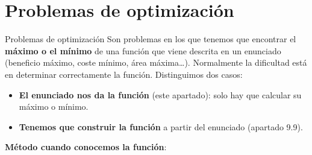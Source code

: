 \documentclass[11pt,a4paper]{article}
\makeatletter
\newcommand{\fmm}[1]{\setbox0=\hbox{$#1$}\ifdim\wd0>0.8\linewidth\def\fmmnext{\fmmdisp{#1}}\else\def\fmmnext{\mbox{\box0}}\fi\fmmnext}
\def\fmmdisp#1{\@ifnextchar.{\fmmdispp{#1}}{\@ifnextchar,{\fmmdispc{#1}}{\@ifnextchar;{\fmmdisps{#1}}{\fmdisp{#1}}}}}
\def\fmmdispp#1.{\fmdisp{#1\,.}}\def\fmmdispc#1,{\fmdisp{#1\,,}}\def\fmmdisps#1;{\fmdisp{#1\,;}}
\newcommand{\fmdisp}[1]{\[\setbox2=\hbox{$\displaystyle #1$}\ifdim\wd2>\linewidth\resizebox{\linewidth}{!}{\box2}\else\box2\fi\]}
\newcommand{\fmuline}[1]{\textbf{\color{fmaccent}#1}}
\makeatother
\begin{document}
\Needspace{5.7cm}
\section{Problemas de optimización}\hypertarget{sec9}{}
\begin{fmdef}{Problemas de optimización}
Son problemas en los que tenemos que encontrar el \textbf{máximo o el mínimo} de una función que viene descrita en un enunciado (beneficio máximo, coste mínimo, área máxima\dots{}). Normalmente la dificultad está en determinar correctamente la función. Distinguimos dos casos:

\begin{itemize}
\item \textbf{El enunciado nos da la función} (este apartado): solo hay que calcular su máximo o mínimo.
\item \textbf{Tenemos que construir la función} a partir del enunciado (apartado 9.9).
\end{itemize}

\fmuline{Método cuando conocemos la función}:

\end{fmdef}
\end{document}
